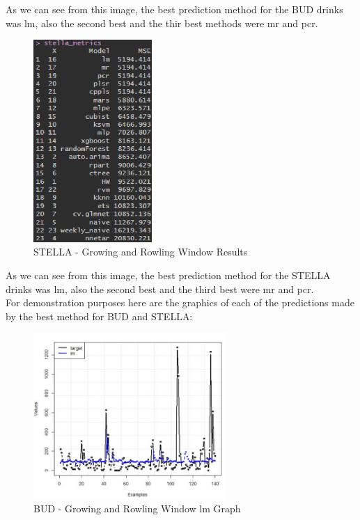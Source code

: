As we can see from this image, the best prediction method for the BUD drinks was lm, also the second best and the thir best methods were mr and pcr.\\

\begin{figure}[H]
    \centering
    \includegraphics[width=0.4\textwidth]{assets/stella-gw.png}
    \caption{STELLA - Growing and Rowling Window Results}
    \label{fig:gw_stella}
    \end{figure}

As we can see from this image, the best prediction method for the STELLA drinks was lm, also the second best and the third best were mr and pcr.\\


For demonstration purposes here are the graphics of each of the predictions made by the best method for BUD and STELLA:


\begin{figure}[H]
    \centering
    \includegraphics[width=0.65\textwidth]{assets/bud-GW.jpeg}
    \caption{BUD - Growing and Rowling Window lm Graph}
    \label{fig:gw_bud}
    \end{figure}


